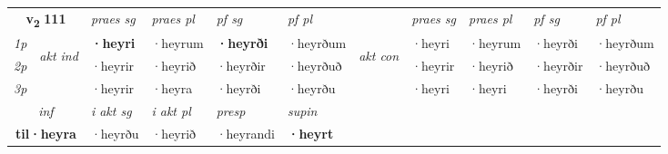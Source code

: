 \noindent
\begin{tabular}{lllllllllll} \toprule
\multicolumn{2}{c}{\textbf{v{\textsubscript{2}}} \Large{\textbf{111}}}  &  \textit{praes sg}  & \textit{praes pl}  &\textit{ pf sg} & \textit{pf pl} &  &  \textit{praes sg}  & \textit{praes pl}  & \textit{pf sg} & \textit{pf pl } \\*
	\cmidrule{3-6} \cmidrule{8-11}
 {\textit{1p}} & \multirow{3}{*}{\begin{turn}{90}\textit{akt ind}\end{turn}} & \textbf{·heyri} & ·heyrum & \textbf{·heyrði} & ·heyrðum & \multirow{3}{*}{\begin{turn}{90}\textit{akt con}\end{turn}} &·heyri & ·heyrum & ·heyrði & ·heyrðum\\*
 {\textit{2p}} &  &  ·heyrir  & ·heyrið & ·heyrðir & ·heyrðuð & & ·heyrir & ·heyrið & ·heyrðir & ·heyrðuð \\*
{\textit{3p}} &  & ·heyrir & ·heyra & ·heyrði & ·heyrðu & & ·heyri & ·heyri& ·heyrði & ·heyrðu \\*
\cmidrule{3-6} \cmidrule{8-11}

   \multicolumn{2}{c}{\textit{inf}}  & \textit{i akt sg} & \textit{i akt pl}   & \textit{presp} & \textit{supin}   \\*
  \multicolumn{2}{c}{\textbf{til\allowbreak ·heyra}} & ·heyrðu  & ·heyrið   & ·heyrandi &  \textbf{·heyrt}   \\*
\end{tabular}

